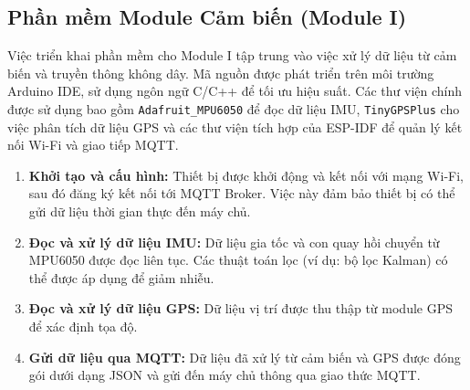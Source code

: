 \subsection{Phần mềm Module Cảm biến (Module I)}
\label{ssec:module_i_software}
Việc triển khai phần mềm cho Module I tập trung vào việc xử lý dữ liệu từ cảm biến và truyền thông không dây. Mã nguồn được phát triển trên môi trường Arduino IDE, sử dụng ngôn ngữ C/C++ để tối ưu hiệu suất. Các thư viện chính được sử dụng bao gồm \texttt{Adafruit\_MPU6050} để đọc dữ liệu IMU, \texttt{TinyGPSPlus} cho việc phân tích dữ liệu GPS và các thư viện tích hợp của ESP-IDF để quản lý kết nối Wi-Fi và giao tiếp MQTT.

\begin{enumerate}
    \item \textbf{Khởi tạo và cấu hình:} Thiết bị được khởi động và kết nối với mạng Wi-Fi, sau đó đăng ký kết nối tới MQTT Broker. Việc này đảm bảo thiết bị có thể gửi dữ liệu thời gian thực đến máy chủ.
    \item \textbf{Đọc và xử lý dữ liệu IMU:} Dữ liệu gia tốc và con quay hồi chuyển từ MPU6050 được đọc liên tục. Các thuật toán lọc (ví dụ: bộ lọc Kalman) có thể được áp dụng để giảm nhiễu.
    \item \textbf{Đọc và xử lý dữ liệu GPS:} Dữ liệu vị trí được thu thập từ module GPS để xác định tọa độ.
    \item \textbf{Gửi dữ liệu qua MQTT:} Dữ liệu đã xử lý từ cảm biến và GPS được đóng gói dưới dạng JSON và gửi đến máy chủ thông qua giao thức MQTT.
\end{enumerate}
